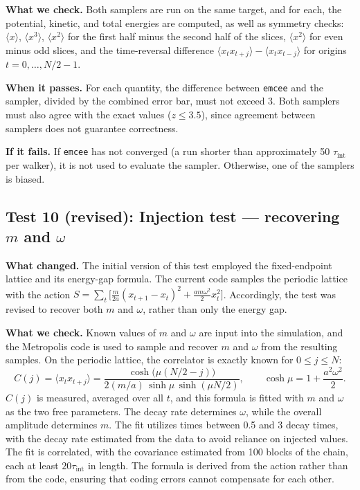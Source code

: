 \documentclass[11pt]{article}
\begin{document}
\textbf{What we check.} Both samplers are run on the same target, and for each, the potential, kinetic, and total energies are computed, as well as symmetry checks: $\langle x\rangle$, $\langle x^3\rangle$, $\langle x^2\rangle$ for the first half minus the second half of the slices, $\langle x^2\rangle$ for even minus odd slices, and the time-reversal difference $\langle x_t x_{t+j}\rangle - \langle x_t x_{t-j}\rangle$ for origins $t = 0, \dots, N/2-1$.

\textbf{When it passes.} For each quantity, the difference between \texttt{emcee} and the sampler, divided by the combined error bar, must not exceed 3. Both samplers must also agree with the exact values ($z \le 3.5$), since agreement between samplers does not guarantee correctness.

\textbf{If it fails.} If \texttt{emcee} has not converged (a run shorter than approximately 50 $\tau_{\text{int}}$ per walker), it is not used to evaluate the sampler. Otherwise, one of the samplers is biased.

\subsection*{Test 10 (revised): Injection test --- recovering $m$ and $\omega$}
\textbf{What changed.} The initial version of this test employed the fixed-endpoint lattice and its energy-gap formula. The current code samples the periodic lattice with the action $S=\sum_t\big[\tfrac{m}{2a}(x_{t+1}-x_t)^2+\tfrac{a m\omega^2}{2}x_t^2\big]$. Accordingly, the test was revised to recover both $m$ and $\omega$, rather than only the energy gap.

\textbf{What we check.} Known values of $m$ and $\omega$ are input into the simulation, and the Metropolis code is used to sample and recover $m$ and $\omega$ from the resulting samples. On the periodic lattice, the correlator is exactly known for $0 \le j \le N$:
\begin{equation}
C(j) = \langle x_t x_{t+j}\rangle
= \frac{\cosh\big(\mu(N/2-j)\big)}{2(m/a)\,\sinh\mu\,\sinh(\mu N/2)},
\qquad \cosh\mu = 1 + \frac{a^2\omega^2}{2}.
\end{equation}
$C(j)$ is measured, averaged over all $t$, and this formula is fitted with $m$ and $\omega$ as the two free parameters. The decay rate determines $\omega$, while the overall amplitude determines $m$. The fit utilizes times between 0.5 and 3 decay times, with the decay rate estimated from the data to avoid reliance on injected values. The fit is correlated, with the covariance estimated from 100 blocks of the chain, each at least $20\tau_{\text{int}}$ in length. The formula is derived from the action rather than from the code, ensuring that coding errors cannot compensate for each other.
\end{document}
